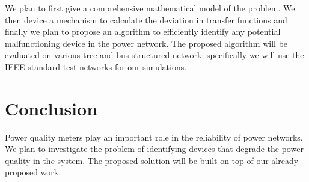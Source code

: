\documentclass[12pt,oneside]{book}
\begin{document}
We plan to first give a comprehensive mathematical model of the problem. We then device a mechanism to calculate the deviation in transfer functions and finally we plan to propose an algorithm to efficiently identify any potential malfunctioning device in the power network. The proposed algorithm will be evaluated on various tree and bus structured network; specifically we will use the IEEE standard test networks for our simulations.

\section{Conclusion}
Power quality meters play an important role in the reliability of power networks. We plan to investigate the problem of identifying devices that degrade the power quality in the system. The proposed solution will be built on top of our already proposed work.


\end{document}
